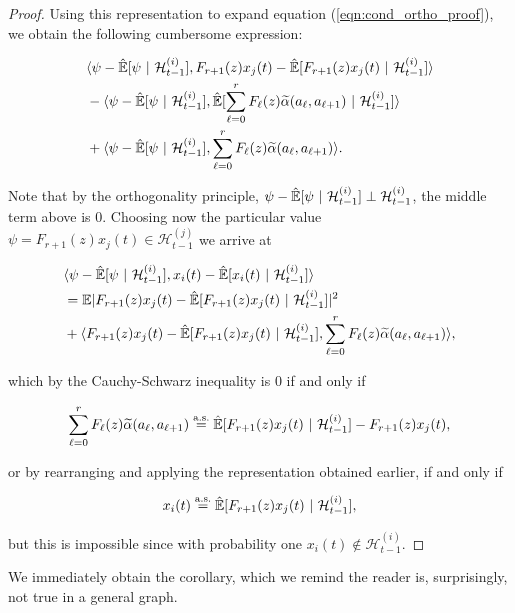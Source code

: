 \documentclass[12pt]{article}
\def\H{\mathcal{H}}  %
\newcommand{\linE}[2]{\hat{\E}[#1\ |\ #2]}  %
\newcommand{\wtalpha}[2]{\widetilde{\alpha}(#1, #2)}  %
\begin{document}
\begin{proof}
  Using this representation to expand equation (\ref{eqn:cond_ortho_proof}), we obtain the following cumbersome expression:

  \begin{align*}
    &\inner{\psi - \linE{\psi}{\H_{t - 1}^{(i)}}}{F_{r + 1}(z)x_j(t) - \linE{F_{r + 1}(z)x_j(t)}{\H_{t - 1}^{(i)}}}\\
    &- \inner{\psi - \linE{\psi}{\H_{t - 1}^{(i)}}}{\linE{\sum_{\ell = 0}^r F_\ell(z)\wtalpha{a_\ell}{a_{\ell + 1}}}{\H_{t - 1}^{(i)}}}\\
    &+ \inner{\psi - \linE{\psi}{\H_{t - 1}^{(i)}}}{\sum_{\ell = 0}^r F_\ell(z)\wtalpha{a_\ell}{a_{\ell + 1}}}.
  \end{align*}

  Note that by the orthogonality principle, $\psi - \linE{\psi}{\H_{t - 1}^{(i)}} \perp \H_{t - 1}^{(i)}$, the middle term above is $0$.  Choosing now the particular value $\psi = F_{r + 1}(z)x_j(t) \in \H_{t - 1}^{(j)}$ we arrive at

  \begin{align*}
    &\inner{\psi - \linE{\psi}{\H_{t - 1}^{(i)}}}{x_i(t) - \linE{x_i(t)}{\H_{t - 1}^{(i)}}}\\
    &= \E|F_{r + 1}(z)x_j(t) - \linE{F_{r + 1}(z)x_j(t)}{\H_{t - 1}^{(i)}}|^2\\
    &+ \inner{F_{r + 1}(z)x_j(t) - \linE{F_{r + 1}(z)x_j(t)}{\H_{t - 1}^{(i)}}}{\sum_{\ell = 0}^r F_\ell(z) \wtalpha{a_\ell}{a_{\ell + 1}}},
  \end{align*}

  which by the Cauchy-Schwarz inequality is $0$ if and only if

  \begin{equation*}
    \sum_{\ell = 0}^r F_\ell(z) \wtalpha{a_\ell}{a_{\ell + 1}} \overset{\text{a.s.}}{=} \linE{F_{r + 1}(z)x_j(t)}{\H_{t - 1}^{(i)}} - F_{r + 1}(z)x_j(t),
  \end{equation*}

  or by rearranging and applying the representation obtained earlier, if and only if

  \begin{equation*}
    x_i(t) \overset{\text{a.s.}}{=} \linE{F_{r + 1}(z)x_j(t)}{\H_{t - 1}^{(i)}},
  \end{equation*}

  but this is impossible since with probability one $x_i(t) \not \in \H_{t - 1}^{(i)}$.
\end{proof}

We immediately obtain the corollary, which we remind the reader is,
surprisingly, not true in a general graph.
\end{document}

